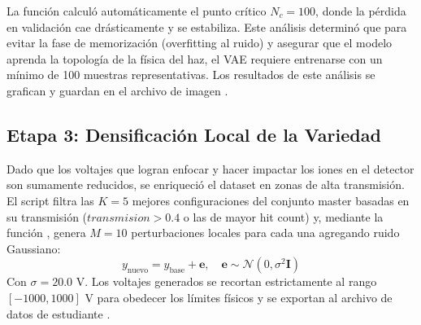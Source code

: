 \documentclass[12pt,letterpaper]{article}
\begin{document}
La función  calculó automáticamente el punto crítico $N_c = 100$, donde la pérdida en validación cae drásticamente y se estabiliza. Este análisis determinó que para evitar la fase de memorización (overfitting al ruido) y asegurar que el modelo aprenda la topología de la física del haz, el VAE requiere entrenarse con un mínimo de 100 muestras representativas. Los resultados de este análisis se grafican y guardan en el archivo de imagen .

\subsection{Etapa 3: Densificación Local de la Variedad}
Dado que los voltajes que logran enfocar y hacer impactar los iones en el detector son sumamente reducidos, se enriqueció el dataset en zonas de alta transmisión. El script filtra las $K=5$ mejores configuraciones del conjunto master basadas en su transmisión ($transmision > 0.4$ o las de mayor hit count) y, mediante la función , genera $M=10$ perturbaciones locales para cada una agregando ruido Gaussiano:
\begin{equation}
    y_{\text{nuevo}} = y_{\text{base}} + \mathbf{e}, \quad \mathbf{e} \sim \mathcal{N}(0, \sigma^2 \mathbf{I})
\end{equation}
Con $\sigma = 20.0\text{ V}$. Los voltajes generados se recortan estrictamente al rango $[-1000, 1000]\text{ V}$ para obedecer los límites físicos y se exportan al archivo de datos de estudiante .
\end{document}
